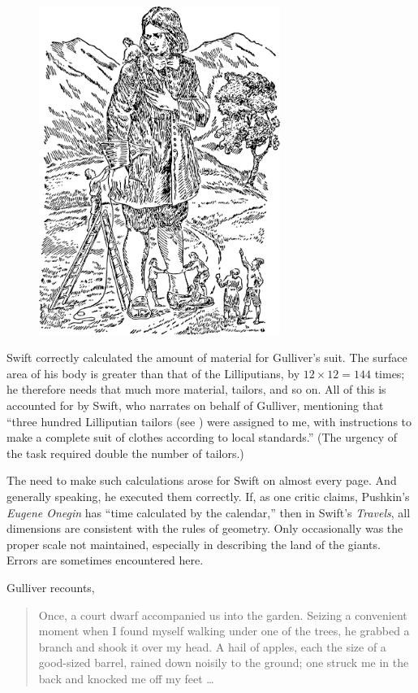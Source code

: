 \begin{figure}[h!]
\centering
\includegraphics[width=0.7\textwidth]{figures/ch-11/fig-173.pdf}
\end{figure}


Swift correctly calculated the amount of material for Gulliver's suit. The surface area of his body is greater than that of the Lilliputians, by $12 \times 12 = 144$ times; he therefore needs that much more material, tailors, and so on. All of this is accounted for by Swift, who narrates on behalf of Gulliver, mentioning that ``three hundred Lilliputian tailors (see ) were assigned to me, with instructions to make a complete suit of clothes according to local standards.'' (The urgency of the task required double the number of tailors.)

The need to make such calculations arose for Swift on almost every page. And generally speaking, he executed them correctly. If, as one critic claims, Pushkin's \emph{Eugene Onegin} has ``time calculated by the calendar,'' then in Swift's \emph{Travels}, all dimensions are consistent with the rules of geometry. Only occasionally was the proper scale not maintained, especially in describing the land of the giants. Errors are sometimes encountered here.

Gulliver recounts,
\begin{quote}
Once, a court dwarf accompanied us into the garden. Seizing a convenient moment when I found myself walking under one of the trees, he grabbed a branch and shook it over my head. A hail of apples, each the size of a good-sized barrel, rained down noisily to the ground; one struck me in the back and knocked me off my feet \dots{}
\end{quote}

